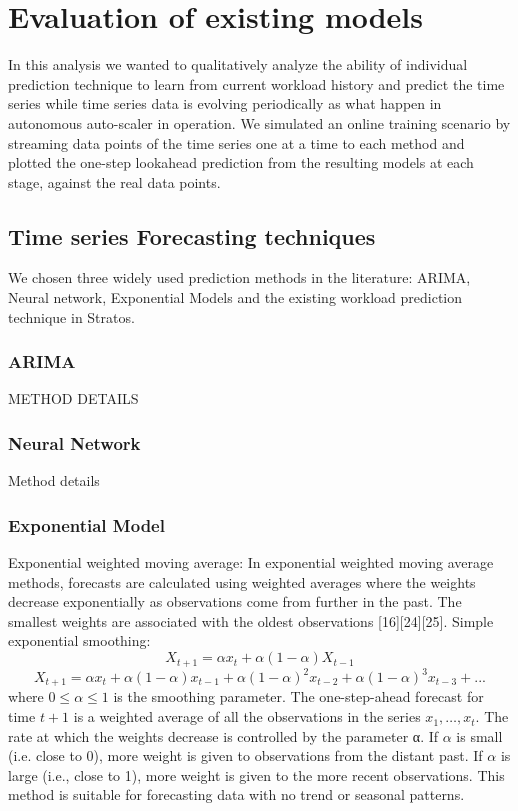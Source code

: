 \section{Evaluation of existing models}

In this analysis we wanted to qualitatively analyze the ability of individual prediction technique to learn from current workload history and predict the time series while time series data is evolving periodically as what happen in autonomous auto-scaler in operation. We simulated an online training scenario by streaming data points of the time series one at a time to each method and plotted the one-step lookahead prediction from the resulting models at each stage, against the real data points. 

\subsection{Time series Forecasting techniques}
We chosen three widely used prediction methods in the literature: ARIMA, Neural network, Exponential Models and the existing workload prediction technique in Stratos.

\subsubsection{ARIMA}
METHOD DETAILS

\subsubsection{Neural Network}
Method details

\subsubsection{Exponential Model}
Exponential weighted moving average: In exponential weighted moving average methods, forecasts are calculated using weighted averages where the weights decrease exponentially as observations come from further in the past. The smallest weights are associated with the oldest observations [16][24][25].
Simple exponential smoothing:
	$$X_{t+1}=\alpha x_t +\alpha(1-\alpha)X_{t-1}$$
	$$X_{t+1}=\alpha x_t +\alpha(1-\alpha)x_{t-1}+\alpha(1-\alpha)^2x_{t-2}+\alpha(1-\alpha)^3x_{t-3}+...$$
where $0\leq \alpha \leq 1$ is the smoothing parameter. The one-step-ahead forecast for time $t+1$ is a weighted average of all the observations in the series $x_1, …, x_t$. The rate at which the weights decrease is controlled by the parameter α. If $\alpha$ is small (i.e. close to 0), more weight is given to observations from the distant past. If $\alpha$ is large (i.e., close to 1), more weight is given to the more recent observations. This method is suitable for forecasting data with no trend or seasonal patterns.

